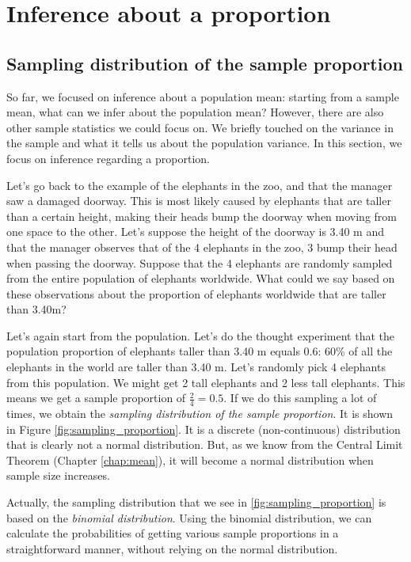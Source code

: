 \chapter{Inference about a proportion}\label{chap:prop}




\section{Sampling distribution of the sample proportion}



So far, we focused on inference about a population mean: starting from a sample mean, what can we infer about the population mean? However, there are also other sample statistics we could focus on. We briefly touched on the variance in the sample and what it tells us about the population variance. In this section, we focus on inference regarding a proportion. 

Let's go back to the example of the elephants in the zoo, and that the manager saw a damaged doorway. This is most likely caused by elephants that are taller than a certain height, making their heads bump the doorway when moving from one space to the other. Let's suppose the height of the doorway is 3.40 m and that the manager observes that of the 4 elephants in the zoo, 3 bump their head when passing the doorway. Suppose that the 4 elephants are randomly sampled from the entire population of elephants worldwide. What could we say based on these observations about the proportion of elephants worldwide that are taller than 3.40m?

Let's again start from the population. Let's do the thought experiment that the population proportion of elephants taller than 3.40 m equals 0.6: 60\% of all the elephants in the world are taller than 3.40 m. Let's randomly pick 4 elephants from this population. We might get 2 tall elephants and 2 less tall elephants. This means we get a sample proportion of $\frac{2}{4} = 0.5$. If we do this sampling a lot of times, we obtain the \textit{sampling distribution of the sample proportion}. It is shown in Figure \ref{fig:sampling_proportion}. It is a discrete (non-continuous) distribution that is clearly not a normal distribution. But, as we know from the Central Limit Theorem (Chapter \ref{chap:mean}), it will become a normal distribution when sample size increases.

Actually, the sampling distribution that we see in \ref{fig:sampling_proportion} is based on the \textit{binomial distribution}. Using the binomial distribution, we can calculate the probabilities of getting various sample proportions in a straightforward manner, without relying on the normal distribution. 


